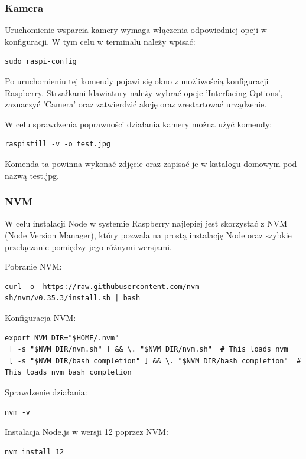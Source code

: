 \subsubsection{Kamera}

Uruchomienie wsparcia kamery wymaga włączenia odpowiedniej opcji w konfiguracji. W tym celu w terminalu należy wpisać:

\begin{lstlisting}
sudo raspi-config
\end{lstlisting}

Po uruchomieniu tej komendy pojawi się okno z możliwością konfiguracji Raspberry. Strzałkami klawiatury należy wybrać opcje 'Interfacing Options',  zaznaczyć 'Camera' oraz zatwierdzić akcję oraz zrestartować urządzenie.

W celu sprawdzenia poprawności działania kamery można użyć komendy:

\begin{lstlisting}
raspistill -v -o test.jpg
\end{lstlisting}

Komenda ta powinna wykonać zdjęcie oraz zapisać je w katalogu domowym pod nazwą test.jpg.

\subsubsection{NVM}

W celu instalacji Node w systemie Raspberry najlepiej jest skorzystać z NVM (Node Version Manager), który pozwala na prostą instalację Node oraz szybkie przełączanie pomiędzy jego różnymi wersjami.

Pobranie NVM:
\begin{lstlisting}[breaklines=true]
curl -o- https://raw.githubusercontent.com/nvm-sh/nvm/v0.35.3/install.sh | bash
\end{lstlisting}

Konfiguracja NVM:
\begin{lstlisting}[breaklines=true]
export NVM_DIR="$HOME/.nvm"
 [ -s "$NVM_DIR/nvm.sh" ] && \. "$NVM_DIR/nvm.sh"  # This loads nvm
 [ -s "$NVM_DIR/bash_completion" ] && \. "$NVM_DIR/bash_completion"  # This loads nvm bash_completion
\end{lstlisting}

Sprawdzenie działania:
\begin{lstlisting}
nvm -v
\end{lstlisting}

Instalacja Node.js w wersji 12 poprzez NVM:
\begin{lstlisting}
nvm install 12
\end{lstlisting}


